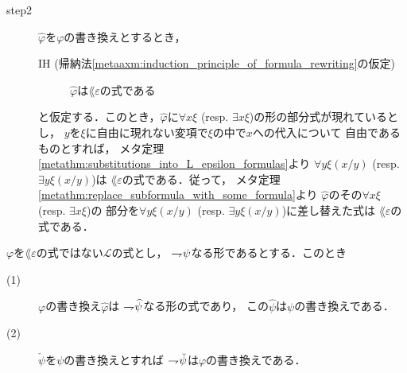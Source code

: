 \begin{metaprf}
\begin{description}
			\item[step2] $\widehat{\varphi}$を$\varphi$の書き換えとするとき，
				\begin{description}
					\item[IH (帰納法\ref{metaaxm:induction_principle_of_formula_rewriting}の仮定)]
						$\widehat{\varphi}$は$\lang{\varepsilon}$の式である
				\end{description}
				と仮定する．このとき，$\widehat{\varphi}$に$\forall x \xi$ 
				(resp. $\exists x \xi$)の形の部分式が現れているとし，
				$y$を$\xi$に自由に現れない変項で$\xi$の中で$x$への代入について
				自由であるものとすれば，
				メタ定理\ref{metathm:substitutions_into_L_epsilon_formulas}より
				$\forall y \xi(x/y)$ (resp. $\exists y \xi(x/y)$)は
				$\lang{\varepsilon}$の式である．従って，
				メタ定理\ref{metathm:replace_subformula_with_some_formula}より
				$\widehat{\varphi}$のその$\forall x \xi$ (resp. $\exists x \xi$)の
				部分を$\forall y \xi(x/y)$ (resp. $\exists y \xi(x/y)$)に差し替えた式は
				$\lang{\varepsilon}$の式である．
				\QED
		\end{description}
	\end{metaprf}
	
	\begin{screen}
		\begin{metathm}[部分式の書き換えとの関係1]
		\label{metathm:relation_to_subformula_rewriting_1}
			$\varphi$を$\lang{\varepsilon}$の式ではない$\mathcal{L}$の式とし，
			$\rightharpoondown\hspace{-0.25em} \psi$なる形であるとする．このとき
			\begin{description}
				\item[(1)] $\varphi$の書き換え$\widehat{\varphi}$は
					$\rightharpoondown\hspace{-0.25em} \widehat{\psi}$なる形の式であり，
					この$\widehat{\psi}$は$\psi$の書き換えである．
					
				\item[(2)] $\check{\psi}$を$\psi$の書き換えとすれば
					$\rightharpoondown\hspace{-0.25em} \check{\psi}$は$\varphi$の書き換えである．
			\end{description}
		\end{metathm}
	\end{screen}
	
